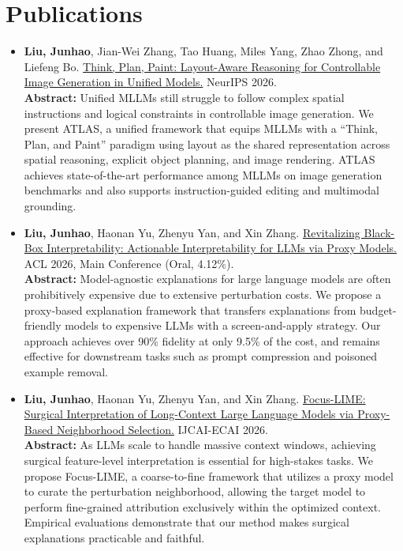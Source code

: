 \documentclass[letterpaper,11pt]{article}
\begin{document}
\section{Publications}
\begin{itemize}[leftmargin=*]
    \item \textbf{Liu, Junhao}, Jian-Wei Zhang, Tao Huang, Miles Yang, Zhao Zhong, and Liefeng Bo. \href{https://arxiv.org/abs/2607.16409}{Think, Plan, Paint: Layout-Aware Reasoning for Controllable Image Generation in Unified Models.} NeurIPS 2026.\vspace{0.2cm}\\
        {\small \textbf{Abstract:} Unified MLLMs still struggle to follow complex spatial instructions and logical constraints in controllable image generation. We present ATLAS, a unified framework that equips MLLMs with a ``Think, Plan, and Paint'' paradigm using layout as the shared representation across spatial reasoning, explicit object planning, and image rendering. ATLAS achieves state-of-the-art performance among MLLMs on image generation benchmarks and also supports instruction-guided editing and multimodal grounding.}

    \item \textbf{Liu, Junhao}, Haonan Yu, Zhenyu Yan, and Xin Zhang. \href{https://aclanthology.org/2026.acl-long.220/}{Revitalizing Black-Box Interpretability: Actionable Interpretability for LLMs via Proxy Models.} ACL 2026, Main Conference (Oral, 4.12\%).\vspace{0.2cm}\\
        {\small \textbf{Abstract:} Model-agnostic explanations for large language models are often prohibitively expensive due to extensive perturbation costs. We propose a proxy-based explanation framework that transfers explanations from budget-friendly models to expensive LLMs with a screen-and-apply strategy. Our approach achieves over 90\% fidelity at only 9.5\% of the cost, and remains effective for downstream tasks such as prompt compression and poisoned example removal.}

    \item \textbf{Liu, Junhao}, Haonan Yu, Zhenyu Yan, and Xin Zhang. \href{https://arxiv.org/abs/2602.04607}{Focus-LIME: Surgical Interpretation of Long-Context Large Language Models via Proxy-Based Neighborhood Selection.} IJCAI-ECAI 2026.\vspace{0.2cm}\\
        {\small \textbf{Abstract:} As LLMs scale to handle massive context windows, achieving surgical feature-level interpretation is essential for high-stakes tasks. We propose Focus-LIME, a coarse-to-fine framework that utilizes a proxy model to curate the perturbation neighborhood, allowing the target model to perform fine-grained attribution exclusively within the optimized context. Empirical evaluations demonstrate that our method makes surgical explanations practicable and faithful.}


\end{itemize}
\end{document}
